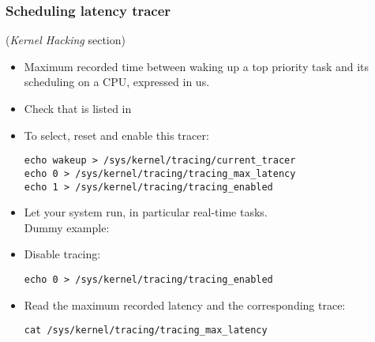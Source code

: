 \begin{frame}[fragile]
  \frametitle{Scheduling latency tracer}
  \fontsize{9}{9}\selectfont
   ({\em Kernel Hacking} section)
  \begin{itemize}
  \item Maximum recorded time between waking up a top priority task
    and its scheduling on a CPU, expressed in us.
  \item Check that  is listed in
  \item To select, reset and enable this tracer:
    \begin{block}{}
\begin{verbatim}
echo wakeup > /sys/kernel/tracing/current_tracer
echo 0 > /sys/kernel/tracing/tracing_max_latency
echo 1 > /sys/kernel/tracing/tracing_enabled
\end{verbatim}
    \end{block}
  \item Let your system run, in particular real-time tasks.\\
    Dummy example: 
  \item Disable tracing:\\
    \begin{block}{}
\begin{verbatim}
echo 0 > /sys/kernel/tracing/tracing_enabled
\end{verbatim}
    \end{block}{}
  \item Read the maximum recorded latency and the corresponding trace:\\
    \begin{block}{}
\begin{verbatim}
cat /sys/kernel/tracing/tracing_max_latency
\end{verbatim}
    \end{block}{}
  \end{itemize}
\end{frame}

